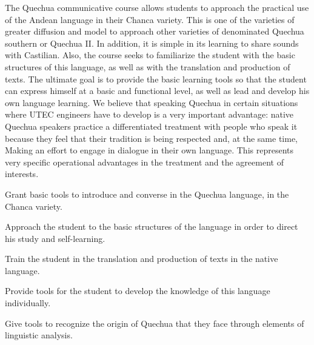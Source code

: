 \begin{syllabus}


\begin{justification}
The Quechua communicative course allows students to approach the practical use of the Andean language in their Chanca variety. This is one of the varieties of greater diffusion and model to approach other varieties of denominated Quechua southern or Quechua II. In addition, it is simple in its learning to share sounds with Castilian. Also, the course seeks to familiarize the student with the basic structures of this language, as well as with the translation and production of texts. The ultimate goal is to provide the basic learning tools so that the student can express himself at a basic and functional level, as well as lead and develop his own language learning.
We believe that speaking Quechua in certain situations where UTEC engineers have to develop is a very important advantage: native Quechua speakers practice a differentiated treatment with people who speak it because they feel that their tradition is being respected and, at the same time, Making an effort to engage in dialogue in their own language. This represents very specific operational advantages in the treatment and the agreement of interests. 
\end{justification}

\begin{goals}
\item Grant basic tools to introduce and converse in the Quechua language, in the Chanca variety.
\item Approach the student to the basic structures of the language in order to direct his study and self-learning.
\item Train the student in the translation and production of texts in the native language.
\item Provide tools for the student to develop the knowledge of this language individually.
\item Give tools to recognize the origin of Quechua that they face through elements of linguistic analysis.
\end{goals}

\begin{outcomes}
    \item {} %
    \item {} %
    \item {} %
    \item {} %
    \item {} %
\end{outcomes}


\end{syllabus}
